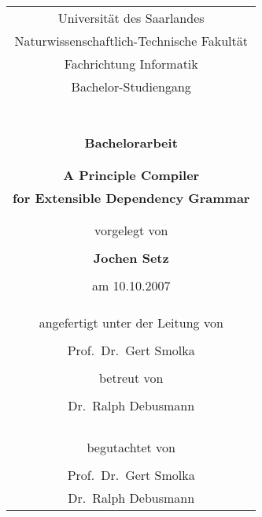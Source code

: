 \begin{titlepage}

\begin{center}
  \begin{tabular}{c}
\LARGE{Universit\"at des Saarlandes}\\
\LARGE{Naturwissenschaftlich-Technische Fakult\"at}\\
\LARGE{Fachrichtung Informatik}\\
\LARGE{Bachelor-Studiengang}
    \\\\\\\\\\
    \\\\\\
\LARGE{\bf{Bachelorarbeit}}\\
\\\\
\huge{\bf{A Principle Compiler}}\\
\huge{\bf{for Extensible Dependency Grammar}}\\\\\\
\LARGE{vorgelegt von}\\\\
\LARGE{\bf{Jochen Setz}}\\\\
\LARGE{am 10.10.2007}\\\\\\\\
\LARGE{angefertigt unter der Leitung von}\\\\
\LARGE{Prof.\ Dr.\ Gert Smolka}\\\\
\LARGE{betreut von}\\\\
\LARGE{Dr.\ Ralph Debusmann}\\\\\\\\\\
\LARGE{begutachtet von}\\\\
\LARGE{Prof.\ Dr.\ Gert Smolka}\\
\LARGE{Dr.\ Ralph Debusmann}
  \end{tabular}
\end{center}




\end{titlepage}
